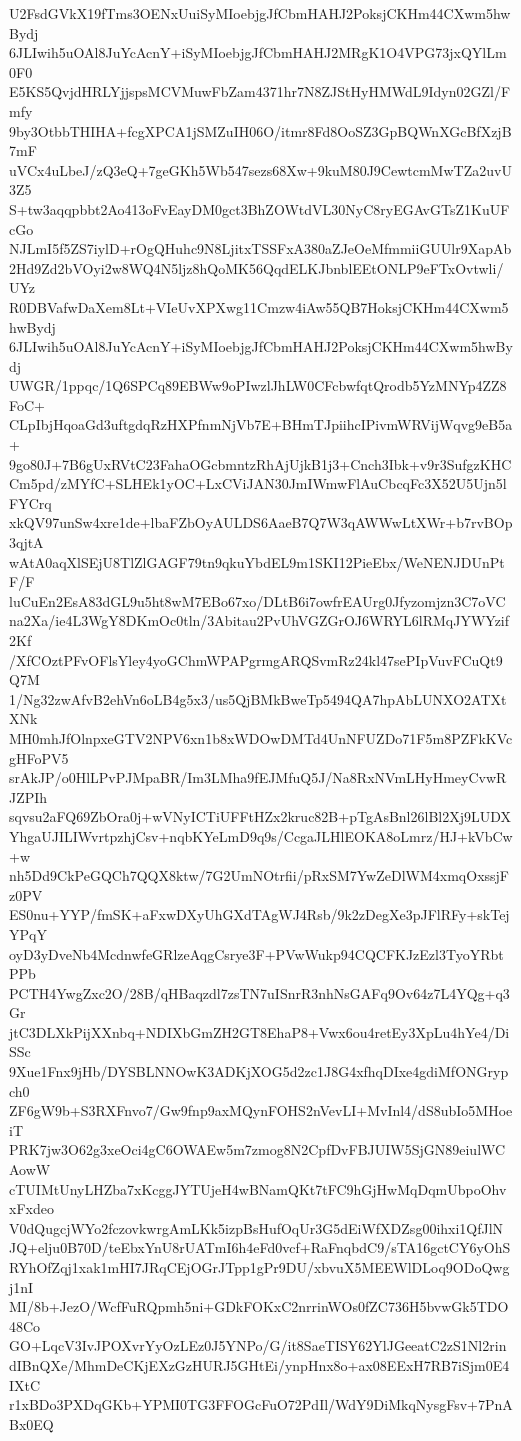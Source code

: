 U2FsdGVkX19fTms3OENxUuiSyMIoebjgJfCbmHAHJ2PoksjCKHm44CXwm5hwBydj
6JLIwih5uOAl8JuYcAcnY+iSyMIoebjgJfCbmHAHJ2MRgK1O4VPG73jxQYlLm0F0
E5KS5QvjdHRLYjjspsMCVMuwFbZam4371hr7N8ZJStHyHMWdL9Idyn02GZl/Fmfy
9by3OtbbTHIHA+fcgXPCA1jSMZuIH06O/itmr8Fd8OoSZ3GpBQWnXGcBfXzjB7mF
uVCx4uLbeJ/zQ3eQ+7geGKh5Wb547sezs68Xw+9kuM80J9CewtcmMwTZa2uvU3Z5
S+tw3aqqpbbt2Ao413oFvEayDM0gct3BhZOWtdVL30NyC8ryEGAvGTsZ1KuUFcGo
NJLmI5f5ZS7iylD+rOgQHuhc9N8LjitxTSSFxA380aZJeOeMfmmiiGUUlr9XapAb
2Hd9Zd2bVOyi2w8WQ4N5ljz8hQoMK56QqdELKJbnblEEtONLP9eFTxOvtwli/UYz
R0DBVafwDaXem8Lt+VIeUvXPXwg11Cmzw4iAw55QB7HoksjCKHm44CXwm5hwBydj
6JLIwih5uOAl8JuYcAcnY+iSyMIoebjgJfCbmHAHJ2PoksjCKHm44CXwm5hwBydj
UWGR/1ppqc/1Q6SPCq89EBWw9oPIwzlJhLW0CFcbwfqtQrodb5YzMNYp4ZZ8FoC+
CLpIbjHqoaGd3uftgdqRzHXPfnmNjVb7E+BHmTJpiihcIPivmWRVijWqvg9eB5a+
9go80J+7B6gUxRVtC23FahaOGcbmntzRhAjUjkB1j3+Cnch3Ibk+v9r3SufgzKHC
Cm5pd/zMYfC+SLHEk1yOC+LxCViJAN30JmIWmwFlAuCbcqFc3X52U5Ujn5lFYCrq
xkQV97unSw4xre1de+lbaFZbOyAULDS6AaeB7Q7W3qAWWwLtXWr+b7rvBOp3qjtA
wAtA0aqXlSEjU8TlZlGAGF79tn9qkuYbdEL9m1SKI12PieEbx/WeNENJDUnPtF/F
luCuEn2EsA83dGL9u5ht8wM7EBo67xo/DLtB6i7owfrEAUrg0Jfyzomjzn3C7oVC
na2Xa/ie4L3WgY8DKmOc0tln/3Abitau2PvUhVGZGrOJ6WRYL6lRMqJYWYzif2Kf
/XfCOztPFvOFlsYley4yoGChmWPAPgrmgARQSvmRz24kl47sePIpVuvFCuQt9Q7M
1/Ng32zwAfvB2ehVn6oLB4g5x3/us5QjBMkBweTp5494QA7hpAbLUNXO2ATXtXNk
MH0mhJfOlnpxeGTV2NPV6xn1b8xWDOwDMTd4UnNFUZDo71F5m8PZFkKVcgHFoPV5
srAkJP/o0HlLPvPJMpaBR/Im3LMha9fEJMfuQ5J/Na8RxNVmLHyHmeyCvwRJZPIh
sqvsu2aFQ69ZbOra0j+wVNyICTiUFFtHZx2kruc82B+pTgAsBnl26lBl2Xj9LUDX
YhgaUJILIWvrtpzhjCsv+nqbKYeLmD9q9s/CcgaJLHlEOKA8oLmrz/HJ+kVbCw+w
nh5Dd9CkPeGQCh7QQX8ktw/7G2UmNOtrfii/pRxSM7YwZeDlWM4xmqOxssjFz0PV
ES0nu+YYP/fmSK+aFxwDXyUhGXdTAgWJ4Rsb/9k2zDegXe3pJFlRFy+skTejYPqY
oyD3yDveNb4McdnwfeGRlzeAqgCsrye3F+PVwWukp94CQCFKJzEzl3TyoYRbtPPb
PCTH4YwgZxc2O/28B/qHBaqzdl7zsTN7uISnrR3nhNsGAFq9Ov64z7L4YQg+q3Gr
jtC3DLXkPijXXnbq+NDIXbGmZH2GT8EhaP8+Vwx6ou4retEy3XpLu4hYe4/DiSSc
9Xue1Fnx9jHb/DYSBLNNOwK3ADKjXOG5d2zc1J8G4xfhqDIxe4gdiMfONGrypch0
ZF6gW9b+S3RXFnvo7/Gw9fnp9axMQynFOHS2nVevLI+MvInl4/dS8ubIo5MHoeiT
PRK7jw3O62g3xeOci4gC6OWAEw5m7zmog8N2CpfDvFBJUIW5SjGN89eiulWCAowW
cTUIMtUnyLHZba7xKcggJYTUjeH4wBNamQKt7tFC9hGjHwMqDqmUbpoOhvxFxdeo
V0dQugcjWYo2fczovkwrgAmLKk5izpBsHufOqUr3G5dEiWfXDZsg00ihxi1QfJlN
JQ+elju0B70D/teEbxYnU8rUATmI6h4eFd0vcf+RaFnqbdC9/sTA16gctCY6yOhS
RYhOfZqj1xak1mHI7JRqCEjOGrJTpp1gPr9DU/xbvuX5MEEWlDLoq9ODoQwgj1nI
MI/8b+JezO/WcfFuRQpmh5ni+GDkFOKxC2nrrinWOs0fZC736H5bvwGk5TDO48Co
GO+LqcV3IvJPOXvrYyOzLEz0J5YNPo/G/it8SaeTISY62YlJGeeatC2zS1Nl2rin
dIBnQXe/MhmDeCKjEXzGzHURJ5GHtEi/ynpHnx8o+ax08EExH7RB7iSjm0E4IXtC
r1xBDo3PXDqGKb+YPMI0TG3FFOGcFuO72PdIl/WdY9DiMkqNysgFsv+7PnABx0EQ
